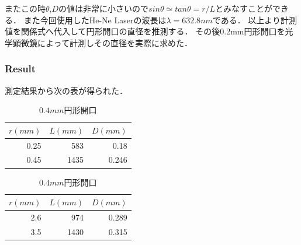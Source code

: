 \documentclass[11pt, a4paper]{jsarticle}
\begin{document}
またこの時$\theta$,$D$の値は非常に小さいので$sin\theta \simeq tan\theta = r/L$とみなすことができる．
また今回使用したHe-Ne Laserの波長は$\lambda = 632.8nm$である．
以上より計測値を関係式へ代入して円形開口の直径を推測する．
その後0.2mm円形開口を光学顕微鏡によって計測しその直径を実際に求めた．

\subsubsection{Result}
測定結果から次の表が得られた．
\begin{table}[htb]
 \begin{minipage}{0.45\hsize}
  \begin{center}
    \caption{$0.2mm$円形開口}
    \begin{tabular}{rrr} \hline
        $r(mm)$ & $L(mm)$ & $D(mm)$  \\ \hline
        0.25     & 583 & 0.18\\
        0.45    & 1435 & 0.246\\ \hline
    \end{tabular}
    \label{tab:b}
  \end{center}
 \end{minipage}
 \begin{minipage}{0.45\hsize}
  \begin{center}
    \caption{$0.4mm$円形開口}
    \begin{tabular}{rrr} \hline
        $r(mm)$ & $L(mm)$ & $D(mm)$  \\ \hline
        2.6   & 974 & 0.289\\
        3.5    & 1430 & 0.315\\ \hline
    \end{tabular}
    \label{tab:c}
  \end{center}
 \end{minipage}
\end{table}　
\end{document}
